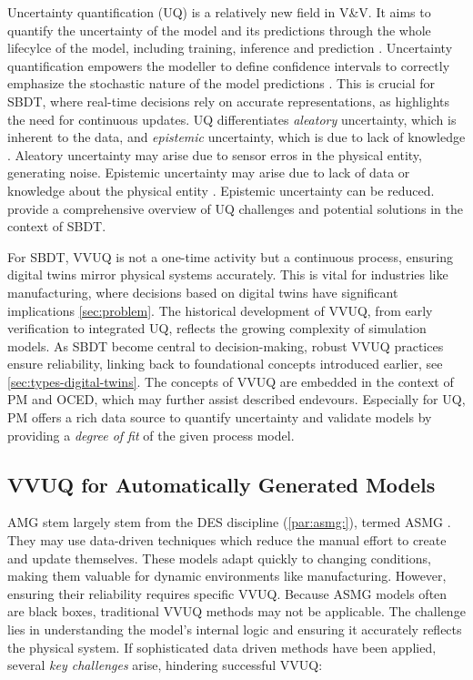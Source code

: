 \label{sec:uncertainty-quantification}
Uncertainty quantification (UQ) is a relatively new field in V&V. It aims to quantify the uncertainty of the model and its predictions through the whole lifecylce of the model, including training, inference and prediction \autocite{sel2025survey}. Uncertainty quantification empowers the modeller to define confidence intervals to correctly emphasize the stochastic nature of the model predictions \autocite{volodina2021importance}. This is crucial for SBDT, where real-time decisions rely on accurate representations, as \autocite{francis2021towards} highlights the need for continuous updates. UQ differentiates \textit{aleatory} uncertainty, which is inherent to the data, and \textit{epistemic} uncertainty, which is due to lack of knowledge \autocite{sel2025survey}. Aleatory uncertainty may arise due to sensor erros in the physical entity, generating noise. Epistemic uncertainty may arise due to lack of data or knowledge about the physical entity \autocite{thelen2023comprehensive}. Epistemic uncertainty can be reduced. \Autocite{abdoune2022handling} provide a comprehensive overview of UQ challenges and potential solutions in the context of SBDT.

For SBDT, VVUQ is not a one-time activity but a continuous process, ensuring digital twins mirror physical systems accurately. This is vital for industries like manufacturing, where decisions based on digital twins have significant implications \autoref{sec:problem}.
The historical development of VVUQ, from early verification to integrated UQ, reflects the growing complexity of simulation models. As SBDT become central to decision-making, robust VVUQ practices ensure reliability, linking back to foundational concepts introduced earlier, see \autoref{sec:types-digital-twins}. The concepts of VVUQ are embedded in the context of PM and OCED, which may further assist described endevours. Especially for UQ, PM offers a rich data source to quantify uncertainty and validate models by providing a \textit{degree of fit} of the given process model.


\subsection{VVUQ for Automatically Generated Models}
\label{sec:requirements-automatically-generated-models}
AMG stem largely stem from the DES discipline (\autoref{par:asmg:}), termed ASMG \autocite{mildeautomated,Charpentier2014}. They may use data-driven techniques which reduce the manual effort to create and update themselves. These models adapt quickly to changing conditions, making them valuable for dynamic environments like manufacturing. However, ensuring their reliability requires specific VVUQ. Because ASMG models often are black boxes, traditional VVUQ methods may not be applicable. The challenge lies in understanding the model's internal logic and ensuring it accurately reflects the physical system. If sophisticated data driven methods have been applied, several \textit{key challenges} arise, hindering successful VVUQ:

